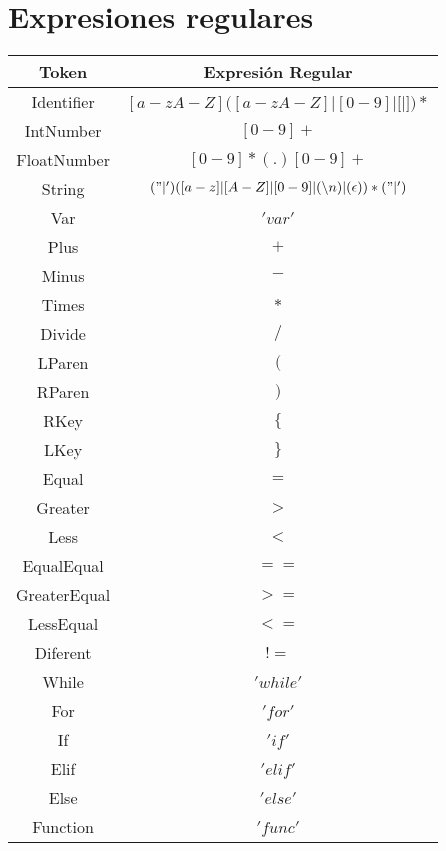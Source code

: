 \documentclass[https://www.overleaf.com/project/63761df255a8a9f4a15c3579
	letterpaper, %
	10pt, %
]{CSUniSchoolLabReport}
\begin{document}
    \section{Expresiones regulares}
    
    \begin{center}
        \begin{tabular}{| c | c |}
            \hline
                Token & Expresión Regular \\ 
            \hline
                Identifier & \([a-zA-Z]([a-zA-Z]|[0-9]|[\)|\(])*\) \\
                IntNumber & \([0-9]+\) \\
                FloatNumber & \([0-9]*(.)[0-9]+\) \\ 
                String & \(("|')([a-z]|[A-Z]|[0-9]|(\setminus n)|(\epsilon))*("|')\) \\ 
                Var & \('var'\) \\
                Plus & \(+\) \\ 
                Minus & \(-\) \\ 
                Times  & \(*\) \\ 
                Divide & \(/\) \\ 
                LParen & \((\) \\ 
                RParen & \()\) \\ 
                RKey & \(\{\) \\ 
                LKey & \(\}\) \\ 
                Equal & \(=\) \\ 
                Greater & \(>\) \\ 
                Less & \(<\) \\ 
                EqualEqual & \(==\) \\ 
                GreaterEqual & \(>=\) \\ 
                LessEqual & \(<=\) \\ 
                Diferent & \(!=\) \\ 
                While & \('while'\) \\ 
                For & \('for'\) \\ 
                If & \('if'\) \\ 
                Elif & \('elif'\) \\
                Else & \('else'\) \\
                Function & \('func'\) \\ 

\end{tabular}
\end{center}
\end{document}
